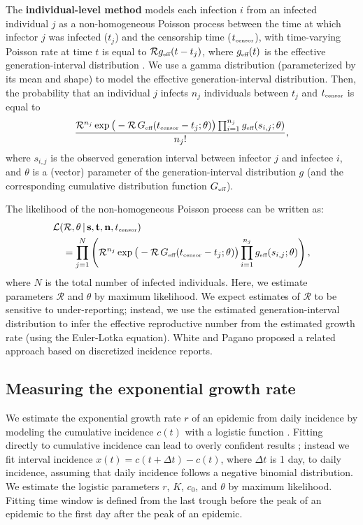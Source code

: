 \documentclass[12pt]{article}
\newcommand{\RR}{\ensuremath{{\mathcal R}}}
\newcommand{\tsub}[2]{#1_{{\textrm{\tiny #2}}}}
\begin{document}
The \textbf{individual-level method} models each infection $i$ from an infected individual $j$ as a non-homogeneous Poisson process between the time at which infector $j$ was infected ($t_j$) and the censorship time ($\tsub{t}{censor}$), with time-varying Poisson rate at time $t$ is equal to $\RR \tsub{g}{eff}(t - t_j)$, where $\tsub{g}{eff}(t)$ is the effective generation-interval distribution \citep{daley2007introduction}.
We use a gamma distribution (parameterized by its mean and shape) to model the effective generation-interval distribution.
Then, the probability that an individual $j$ infects $n_j$ individuals between $t_j$ and $\tsub{t}{censor}$ is equal to
\begin{equation}
\frac{\RR^{n_j} \exp \big(- \RR\, \tsub{G}{eff}(\tsub{t}{censor} - t_j ;\theta) \big) \prod_{i=1}^{n_j} \tsub{g}{eff}(s_{i, j}; \theta)}{n_j!},
\end{equation}
where $s_{i,j}$ is the observed generation interval between infector $j$ and infectee $i$, and $\theta$ is a (vector) parameter of the generation-interval distribution $g$ (and the corresponding cumulative distribution function $\tsub{G}{eff}$).

The likelihood of the non-homogeneous Poisson process can be written as:
\begin{equation}\label{eq:nonhomogeneous}
\begin{aligned}
&\mathcal{L}(\RR, \theta\,|\, \mathbf{s}, \mathbf{t}, \mathbf{n}, \tsub{t}{censor})\\
&\quad=\prod_{j=1}^N \left(\RR^{n_j} \exp \big(- \RR \, \tsub{G}{eff}(\tsub{t}{censor} - t_j ;\theta) \big) \prod_{i=1}^{n_j} \tsub{g}{eff}(s_{i, j}; \theta) \right),
\end{aligned}
\end{equation}
where $N$ is the total number of infected individuals.
Here, we estimate parameters $\RR$ and $\theta$ by maximum likelihood.
We expect estimates of $\RR$ to be sensitive to under-reporting;
instead, we use the estimated generation-interval distribution to infer the effective reproductive number from the estimated growth rate (using the Euler-Lotka equation).
White and Pagano \cite{forsberg2008likelihood} proposed a related approach based on discretized incidence reports.

\subsection{Measuring the exponential growth rate}

We estimate the exponential growth rate $r$ of an epidemic from daily incidence by modeling the cumulative incidence $c(t)$ with a logistic function \citep{ma2014estimating}. 
Fitting directly to cumulative incidence can lead to overly confident results \citep{king2015avoidable}; instead we fit interval incidence $x(t) = c(t + \Delta t) - c(t)$, where $\Delta t$ is 1 day, to daily incidence, assuming that daily incidence follows a negative binomial distribution. 
We estimate the logistic parameters $r$, $K$, $c_0$, and $\theta$ by maximum likelihood.
Fitting time window is defined from the last trough before the peak of an epidemic to the first day after the peak of an epidemic.
\end{document}
